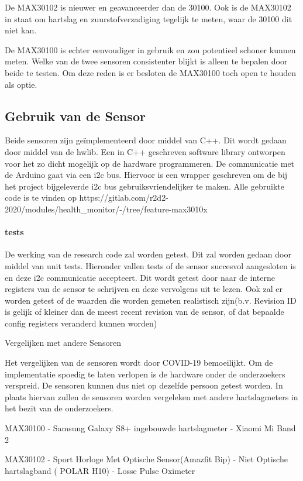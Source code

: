 \documentclass[11pt]{article}
\begin{document}
De MAX30102 is nieuwer en geavanceerder dan de 30100. Ook is de MAX30102 in staat om hartslag en zuurstofverzadiging tegelijk te meten, waar de 30100 dit niet kan.

De MAX30100 is echter eenvoudiger in gebruik en zou potentieel schoner kunnen meten. Welke van de twee sensoren consistenter blijkt is alleen te bepalen door beide te testen. Om  deze reden is er besloten de MAX30100 toch open te houden als optie. 

\subsection{Gebruik van de Sensor}\label{subsec:gebruik van de sensor}
Beide sensoren zijn geïmplementeerd door middel van C++. Dit wordt gedaan door middel van de hwlib. Een in C++ geschreven software library ontworpen voor het zo dicht mogelijk op de hardware programmeren. De communicatie met de Arduino gaat via een i2c bus. Hiervoor is een wrapper geschreven om de bij het project bijgeleverde i2c bus gebruiksvriendelijker te maken. Alle gebruikte code is te vinden op https://gitlab.com/r2d2-2020/modules/health_monitor/-/tree/feature-max3010x

\paragraph{tests} De werking van de research code zal worden getest. Dit zal worden gedaan door middel van unit tests. Hieronder vallen tests of de sensor succesvol aangesloten is en deze i2c communicatie accepteert. Dit wordt getest door naar de interne registers van de sensor te schrijven en deze vervolgens uit te lezen. Ook zal er worden getest of de waarden die worden gemeten realistisch zijn(b.v. Revision ID is gelijk of  kleiner dan de meest recent revision van de sensor, of dat bepaalde config registers veranderd kunnen worden)


Vergelijken met andere Sensoren

Het vergelijken van de sensoren wordt door COVID-19 bemoeilijkt. Om de implementatie spoedig te laten verlopen is de hardware onder de onderzoekers verspreid. De sensoren kunnen dus niet op dezelfde persoon getest worden. In plaats hiervan zullen de sensoren worden vergeleken met andere hartslagmeters in het bezit van de onderzoekers.

MAX30100
- Samsung Galaxy S8+ ingebouwde hartslagmeter
- Xiaomi Mi Band 2

MAX30102
- Sport Horloge Met Optische Sensor(Amazfit Bip)
- Niet Optische hartslagband ( POLAR H10)
- Losse Pulse Oximeter
\end{document}
